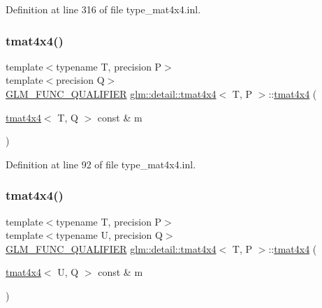 Definition at line 316 of file type\+\_\+mat4x4.\+inl.

\mbox{\label{structglm_1_1detail_1_1tmat4x4_aee39aabdc85b598efc2fa0f515bd7228}} 
\subsubsection{\texorpdfstring{tmat4x4()}{tmat4x4()}\hspace{0.1cm}{\footnotesize\ttfamily [19/22]}}
{\footnotesize\ttfamily template$<$typename T, precision P$>$ \\
template$<$precision Q$>$ \\
\hyperlink{setup_8hpp_a33fdea6f91c5f834105f7415e2a64407}{G\+L\+M\+\_\+\+F\+U\+N\+C\+\_\+\+Q\+U\+A\+L\+I\+F\+I\+ER} \hyperlink{structglm_1_1detail_1_1tmat4x4}{glm\+::detail\+::tmat4x4}$<$ T, P $>$\+::\hyperlink{structglm_1_1detail_1_1tmat4x4}{tmat4x4} (\begin{DoxyParamCaption}\item[{\hyperlink{structglm_1_1detail_1_1tmat4x4}{tmat4x4}$<$ T, Q $>$ const \&}]{m }\end{DoxyParamCaption})}



Definition at line 92 of file type\+\_\+mat4x4.\+inl.

\mbox{\label{structglm_1_1detail_1_1tmat4x4_acd4383cfa5e9463cb5d2e791b34a2a46}} 
\subsubsection{\texorpdfstring{tmat4x4()}{tmat4x4()}\hspace{0.1cm}{\footnotesize\ttfamily [20/22]}}
{\footnotesize\ttfamily template$<$typename T, precision P$>$ \\
template$<$typename U, precision Q$>$ \\
\hyperlink{setup_8hpp_a33fdea6f91c5f834105f7415e2a64407}{G\+L\+M\+\_\+\+F\+U\+N\+C\+\_\+\+Q\+U\+A\+L\+I\+F\+I\+ER} \hyperlink{structglm_1_1detail_1_1tmat4x4}{glm\+::detail\+::tmat4x4}$<$ T, P $>$\+::\hyperlink{structglm_1_1detail_1_1tmat4x4}{tmat4x4} (\begin{DoxyParamCaption}\item[{\hyperlink{structglm_1_1detail_1_1tmat4x4}{tmat4x4}$<$ U, Q $>$ const \&}]{m }\end{DoxyParamCaption})}



